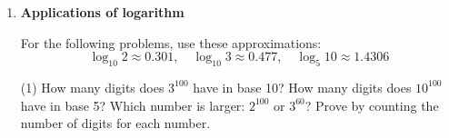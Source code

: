 \begin{enumerate}
Solve the following logarithmic equations. Denote $\log x = \log_{10} x$ and $\ln x = \log_{e} x$.
\begin{tasks}[after-item-skip = 45pt, after-skip = 45pt](2)
\task $\log_{2}(x+3) = 5$
\task $\log_{5}(2x-1) = 2$
\task $\log(x) + \log(x-3) = 1$
\task $\ln(x^2-1) = \ln(3x-1)$
\task $\log_{3}(x+4) - \log_{3}(x) = 2$
\task $2\log(x) = \log(5x-6)$
\end{tasks}

\item \textbf{Applications of logarithm} 

For the following problems, use these approximations:
\[\log_{10} 2 \approx 0.301, \quad \log_{10} 3 \approx 0.477, \quad \log_5 10 \approx 1.4306\]
\begin{tasks}[after-item-skip = 80pt, after-skip = 80pt](1)
\task How many digits does $3^{100}$ have in base 10?
\task How many digits does $10^{100}$ have in base 5?
\task Which number is larger: $2^{100}$ or $3^{60}$? Prove by counting the number of digits for each number.
\end{tasks}

\end{enumerate}